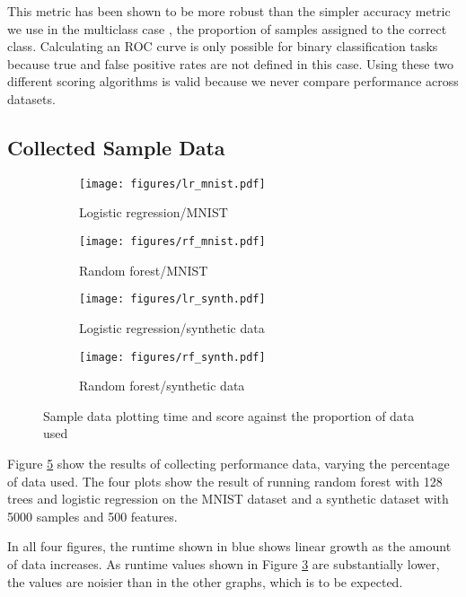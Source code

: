 \documentclass[a4paper,12pt,twoside,openright]{report}
\begin{document}
This metric has been shown to be more robust than the simpler accuracy metric we use in the multiclass case \cite{Bradley97theuse}, the proportion of samples assigned to the correct class. Calculating an ROC curve is only possible for binary classification tasks because true and false positive rates are not defined in this case. Using these two different scoring algorithms is valid because we never compare performance across datasets.





\subsection{Collected Sample Data}

\begin{figure}
\centering
\begin{subfigure}{.45\textwidth}
  \centering
  \texttt{[image: figures/lr\_mnist.pdf]}
  \caption{Logistic regression/MNIST}
  \label{sampledata1}
\end{subfigure}%
\begin{subfigure}{.45\textwidth}
  \centering
  \texttt{[image: figures/rf\_mnist.pdf]}
  \caption{Random forest/MNIST}
  \label{sampledata2}
\end{subfigure}
\begin{subfigure}{.45\textwidth}
  \centering
  \texttt{[image: figures/lr\_synth.pdf]}
  \caption{Logistic regression/synthetic data}
  \label{sampledata3}
\end{subfigure}
\begin{subfigure}{.45\textwidth}
  \centering
  \texttt{[image: figures/rf\_synth.pdf]}
  \caption{Random forest/synthetic data}
  \label{sampledata4}
\end{subfigure}
\caption{Sample data plotting time and score against the proportion of data used}
\label{sampledata}
\end{figure}




Figure \ref{sampledata} show the results of collecting performance data, varying the percentage of data used. The four plots show the result of running random forest with 128 trees and logistic regression on the MNIST dataset and a synthetic dataset with 5000 samples and 500 features.

In all four figures, the runtime shown in blue shows linear growth as the amount of data increases. As runtime values shown in Figure \ref{sampledata3} are substantially lower, the values are noisier than in the other graphs, which is to be expected.
\end{document}
